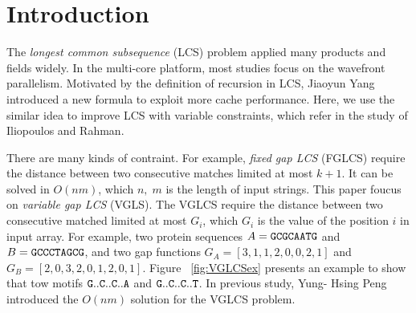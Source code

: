 \section{Introduction} %
\label{sec:Introduction}

The \emph{longest common subsequence} (LCS) problem
\cite{Hirschberg1975ALS} applied many products and fields widely.  In
the multi-core platform, most studies focus on the wavefront
parallelism. Motivated by the definition of recursion in LCS, Jiaoyun
Yang\cite{Yang2010AnEP} introduced a new formula to exploit more cache
performance. Here, we use the similar idea to improve LCS with
variable constraints, which refer in the study of Iliopoulos and
Rahman\cite{Rahman2006AlgorithmsFC}.

\iffalse
最長共同子序列 (\emph{longest common subsequence}, LCS) 廣泛地使用在各個應用上。
在多核心平台下，大多數的研究專注於如何高效率地在波前平行 (wavefront parallelism)，
而 Jiaoyun Yang ~\cite{jiaoyun} 提出的論文中改變一般的 LCS 遞迴定義以得到更好快取使用率。
在這篇論文中，針對在 Iliopoulos 和 Rahman ~\cite{iliopoulos} 提及的約束條件下的 LCS 問題使用相關的想法來改善效能。
\fi

There are many kinds of contraint.  For example, \emph{fixed gap LCS}
(FGLCS) require the distance between two consecutive matches limited
at most $k+1$.  It can be solved in $O(nm)$, which $n, \; m$ is the
length of input strings. This paper foucus on \emph{variable gap LCS}
(VGLS).  The VGLCS require the distance between two consecutive
matched limited at most $G_i$, which $G_i$ is the value of the
position $i$ in input array. For example, two protein sequences $A =
\tt{GCGCAATG}$ and $B = \tt{GCCCTAGCG}$, and two gap functions $G_A =
[3, 1, 1, 2, 0, 0, 2, 1]$ and $G_B = [2, 0, 3, 2, 0, 1, 2, 0, 1]$.
Figure ~\ref{fig:VGLCSex} presents an example to show that tow motifs
$\tt{G..C..C..A}$ and $\tt{G..C..C..T}$.  In previous study, Yung-
Hsing Peng \cite{Yang2010AnEP} introduced the $O(nm)$ solution for the
VGLCS problem.

\iffalse
在約束條件下的 LCS 中，如 \emph{fixed gap LCS } (FGLCS)要求任兩個挑選的距離在相對應的另一個字串中相等，
同時距離最大為 $k+1$，可在時間複雜度在 $O(nm)$ 內解決，其中 $n$, $m$ 分別為兩個輸入的字串長度。
我們將在這篇論文針對 \emph{variable gap LCS} (VGLCS) 進行探討。
在 VGLCS 中，對各個不同的位置提供約束限制，如目前給定兩個字串 $A = \tt{GCGCAATG}$, 
$B = \tt{GCCCTAGCG}$，各自的約束限制為 $G_A = [3, 1, 1, 2, 0, 0, 2, 1]$ 
和 $G_B = [2, 0, 3, 2, 0, 1, 2, 0, 1]$，其中 $G_A(i)$ 表示當挑選第 $i$ 個位置時，與前一個挑選的位置最多差 $G_A(i)+1$，同理 $G_B(i)$；
我們可以得到兩組 VGLCS 的解 $\tt{G..C..C..A}$ 和 $\tt{G..C..C..T}$，挑選的方式如圖 ~\ref{fig:VGLCSex}。
在 Yung-Hsing Peng ~\cite{yunghsing} 的論文已對 VGLCS 提出易於實作的 $O(nm \alpha(n))$ 和理論 $O(nm)$ 的解法。
\fi

